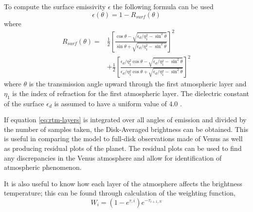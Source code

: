 To compute the surface emissivity $\epsilon$ the following formula can be used
\begin{equation}\label{eq:rtm-esurf}
\epsilon(\theta) = 1-R_{surf}(\theta)
\end{equation}
where
\begin{equation}\label{eq:rtm-rsurf}
\begin{split}
R_{surf}(\theta) =& \frac{1}{2} \left[ \frac{\cos\theta - \sqrt{\epsilon_d/\eta_1^2-\sin^2\theta}}{\sin\theta + \sqrt{\epsilon_d/\eta_1^2-\sin^2\theta}} \right]^2\\
&+\frac{1}{2} \left[ \frac{\epsilon_d/\eta_1^2 \cos\theta - \sqrt{\epsilon_d/\eta_1^2-\sin^2\theta}}{\epsilon_d/\eta_1^2 \cos\theta + \sqrt{\epsilon_d/\eta_1^2-\sin^2\theta}} \right]^2
\end{split}
\end{equation}
where $\theta$ is the transmission angle upward through the first atmospheric layer and $\eta_1$ is the index of refraction for the first atmospheric layer. The dielectric constant of the surface $\epsilon_d$ is assumed to have a uniform value of $4.0$ \cite{Pettengill-1992}.

If equation \ref{eq:rtm-layers} is integrated over all angles of emission and divided by the number of samples taken, the Disk-Averaged brightness can be obtained. This is useful in comparing the model to full-disk observations made of Venus as well as producing residual plots of the planet. The residual plots can be used to find any discrepancies in the Venus atmosphere and allow for identification of atmospheric phenomenon. 

It is also useful to know how each layer of the atmosphere affects the brightness temperature; this can be found through calculation of the weighting function,
\begin{equation}
W_i = (1-e^{\tau,i}) e^{-\tau_{i+1,N}}
\end{equation}











